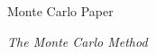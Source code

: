 \documentclass[xcolor=x11names,compress]{beamer}
\renewcommand{\(}{\begin{columns}}
\renewcommand{\)}{\end{columns}}
\newcommand{\<}[1]{\begin{column}{#1}}
\renewcommand{\>}{\end{column}}
\begin{document}
\begin{frame}{Monte Carlo Paper}

    \textit{The Monte Carlo Method}
    
%    
%
%    
    
\end{frame}
\end{document}
